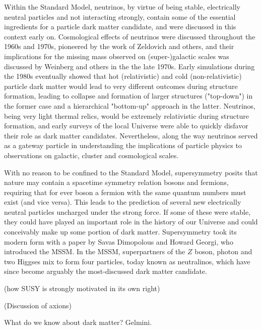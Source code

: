 Within the Standard Model, neutrinos, by virtue of being stable, electrically neutral particles and not interacting strongly, contain some of the essential ingredients for a particle dark matter candidate, and were discussed in this context early on. Cosmological effects of neutrinos were discussed throughout the 1960s and 1970s, pioneered by the work of Zeldovich and others, and their implications for the missing mass observed on (super-)galactic scales was discussed by Weinberg and others in the the late 1970s. Early simulations during the 1980s eventually showed that hot (relativistic) and cold (non-relativistic) particle dark matter would lead to very different outcomes during structure formation, leading to collapse and formation of larger structures ("top-down") in the former case and a hierarchical "bottom-up" approach in the latter. Neutrinos, being very light thermal relics, would be extremely relativistic during structure formation, and early surveys of the local Universe were able to quickly disfavor their role as dark matter candidates. Nevertheless, along the way neutrinos served as a gateway particle in understanding the implications of particle physics to observations on galactic, cluster and cosmological scales.

With no reason to be confined to the Standard Model, supersymmetry posits that nature may contain a spacetime symmetry relation bosons and fermions, requiring that for ever boson a fermion with the same quantum numbers must exist (and vice versa). This leads to the prediction of several new electrically neutral particles uncharged under the strong force. If some of these were stable, they could have played an important role in the history of our Universe and could conceivably make up some portion of dark matter. Supersymmetry took its modern form with a paper by Savas Dimopolous and Howard Georgi, who introduced the MSSM. In the MSSM, superpartners of the $Z$ boson, photon and two Higgses mix to form four particles, today known as neutralinos, which have since become arguably the most-discussed dark matter candidate. 



(how SUSY  is strongly motivated in its own right)

(Discussion of axions)

What do we know about dark matter? Gelmini.

